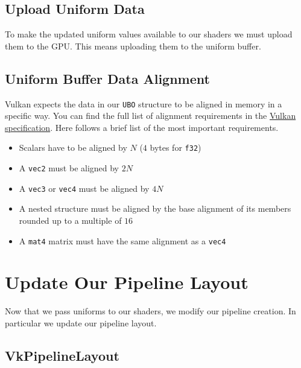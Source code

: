\subsection{Upload Uniform Data}

To make the updated uniform values available to our shaders we must upload them
to the GPU.
This means uploading them to the uniform buffer.

\begin{minipage}{\linewidth}{\noindent}
    
\end{minipage}

\subsection{Uniform Buffer Data Alignment}

Vulkan expects the data in our \texttt{UBO} structure to be aligned in memory
in a specific way.
You can find the full list of alignment requirements in the
\href{https://www.khronos.org/registry/vulkan/specs/1.3-extensions/html/chap15.html#interfaces-resources-layout}{Vulkan specification}.
Here follows a brief list of the most important requirements.

\begin{itemize}
\item Scalars have to be aligned by $N$ ($4$ bytes for \texttt{f32})
\item A \texttt{vec2} must be aligned by $2N$
\item A \texttt{vec3} or \texttt{vec4} must be aligned by $4N$
\item A nested structure must be aligned by the base alignment
of its members rounded up to a multiple of $16$
\item A \texttt{mat4} matrix must have the same alignment as a \texttt{vec4}
\end{itemize}

\section{Update Our Pipeline Layout}

Now that we pass uniforms to our shaders, we modify our pipeline creation.
In particular we update our pipeline layout.

\subsection{VkPipelineLayout}

